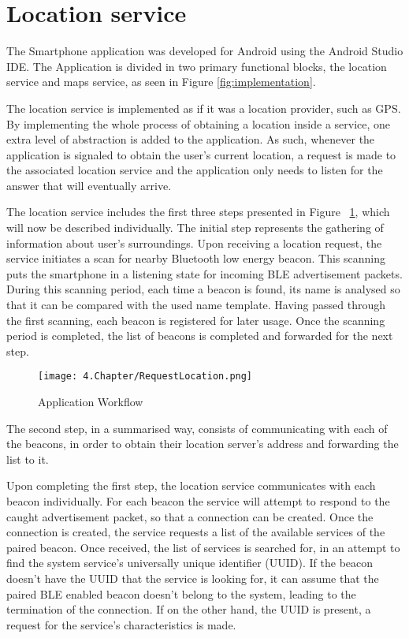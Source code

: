 \section{Location service} 
\label{sec:LocService} 
 
 
The Smartphone application was developed for Android using the Android Studio IDE. The Application is divided in two primary functional blocks, the location service and maps service, as seen in Figure \ref{fig:implementation}. 
 
 
The location service is implemented as if it was a location provider, such as GPS. By implementing the whole process of obtaining a location inside a service, one extra level of abstraction is added to the application. As such, whenever the application is signaled to obtain the user's current location, a request is made to the associated location service and the application only needs to listen for the answer that will eventually arrive. 
 
 
 
 
 
 
The location service includes the first three steps presented in Figure ~\ref{fig:MockProvider}, which will now be described individually. The initial step represents the gathering of information about user's surroundings. Upon receiving a location request, the service initiates a scan for nearby Bluetooth low energy beacon. This scanning puts the smartphone in a listening state for incoming \ac{BLE} advertisement packets. During this scanning period, each time a beacon is found, its name is analysed so that it can be compared with the used name template. Having passed through the first scanning, each beacon is registered for later usage. Once the scanning period is completed, the list of beacons is completed and forwarded for the next step. 
 
 
\begin{figure}[H] 
\centering 
\texttt{[image: 4.Chapter/RequestLocation.png]} 
\caption[Application Workflow]{Application Workflow} 
\label{fig:MockProvider} 
\end{figure} 
 
 
The second step, in a summarised way, consists of communicating with each of the beacons, in order to obtain their location server's address and forwarding the list to it.  
 
 
Upon completing the first step, the location service communicates with each beacon individually. For each beacon the service will attempt to respond to the caught advertisement packet, so that a connection can be created. Once the connection is created, the service requests a list of the available services of the paired beacon. 
Once received, the list of services is searched for, in an attempt to find the system service's universally unique identifier (UUID). If the beacon doesn't have the UUID that the service is looking for, it can assume that the paired \ac{BLE} enabled beacon doesn't belong to the system, leading to the termination of the connection. If on the other hand, the UUID is present, a request for the service's characteristics is made.  
 
